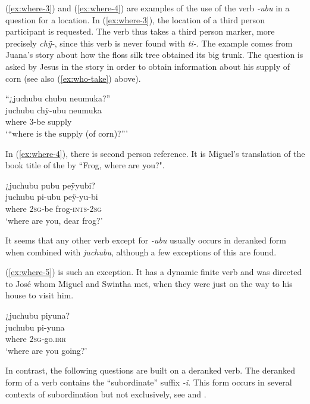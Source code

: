 (\ref{ex:where-3}) and (\ref{ex:where-4}) are examples of the use of the verb \textit{-ubu} in a question for a location. In (\ref{ex:where-3}), the location of a third person participant is requested. The verb thus takes a third person marker, more precisely \textit{chÿ-}, since this verb is never found with \textit{ti-}. The example comes from Juana’s story about how the floss silk tree obtained its big trunk. The question is asked by Jesus in the story in order to obtain information about his supply of corn (see also (\ref{ex:who-take}) above).

\ea\label{ex:where-3}
\begingl
\glpreamble “¿juchubu chubu neumuka?”\\
\gla juchubu chÿ-ubu neumuka\\
\glb where 3-be supply\\
\glft ‘“where is the supply (of corn)?”’
\endgl
\trailingcitation{[jxx-n101013s-1.659]}
\xe

In (\ref{ex:where-4}), there is second person reference. It is Miguel’s translation of the book title of the  by \citet[]{Mayer2003} “Frog, where are you?".

\ea\label{ex:where-4}
\begingl
\glpreamble ¿juchubu pubu peÿyubi?\\
\gla juchubu pi-ubu peÿ-yu-bi\\
\glb where 2\textsc{sg}-be frog-\textsc{ints}-2\textsc{sg}\\
\glft ‘where are you, dear frog?’
\endgl
\trailingcitation{[mox-a110920l-2.197]}
\xe

It seems that any other verb except for \textit{-ubu} usually occurs in deranked form when combined with \textit{juchubu}, although a few exceptions of this are found.

(\ref{ex:where-5}) is such an exception. It has a dynamic finite verb and was directed to José whom Miguel and Swintha met, when they were just on the way to his house to visit him.

\ea\label{ex:where-5}
\begingl
\glpreamble ¿juchubu piyuna?\\
\gla juchubu pi-yuna\\
\glb where 2\textsc{sg}-go.\textsc{irr}\\
\glft ‘where are you going?’
\endgl
\trailingcitation{[mox-c110926s-1.132]}
\xe

In contrast, the following questions are built on a deranked verb. The deranked form of a verb contains the “subordinate” suffix \textit{-i}. This form occurs in several contexts of subordination but not exclusively, see  and .

